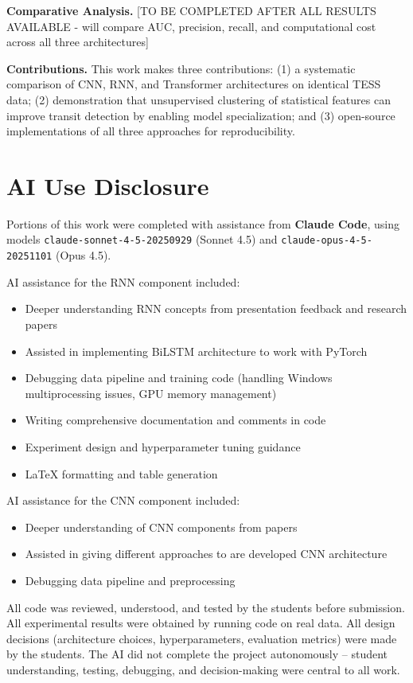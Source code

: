 \documentclass[letterpaper]{article} %
\begin{document}
\textbf{Comparative Analysis.} [TO BE COMPLETED AFTER ALL RESULTS AVAILABLE - will compare AUC, precision, recall, and computational cost across all three architectures]

\textbf{Contributions.} This work makes three contributions: (1) a systematic comparison of CNN, RNN, and Transformer architectures on identical TESS data; (2) demonstration that unsupervised clustering of statistical features can improve transit detection by enabling model specialization; and (3) open-source implementations of all three approaches for reproducibility.

\section*{AI Use Disclosure}

Portions of this work were completed with assistance from \textbf{Claude Code}, using models \texttt{claude-sonnet-4-5-20250929} (Sonnet 4.5) and \texttt{claude-opus-4-5-20251101} (Opus 4.5).

AI assistance for the RNN component included:
\begin{itemize}
\item Deeper understanding RNN concepts from presentation feedback and research papers
\item Assisted in implementing BiLSTM architecture to work with PyTorch
\item Debugging data pipeline and training code (handling Windows multiprocessing issues, GPU memory management)
\item Writing comprehensive documentation and comments in code
\item Experiment design and hyperparameter tuning guidance
\item LaTeX formatting and table generation
\end{itemize}

AI assistance for the CNN component included:
\begin{itemize}
\item Deeper understanding of CNN components from papers
\item Assisted in giving different approaches to are developed CNN architecture
\item Debugging data pipeline and preprocessing
\end{itemize}

All code was reviewed, understood, and tested by the students before submission. All experimental results were obtained by running code on real data. All design decisions (architecture choices, hyperparameters, evaluation metrics) were made by the students. The AI did not complete the project autonomously -- student understanding, testing, debugging, and decision-making were central to all work.



\end{document}
